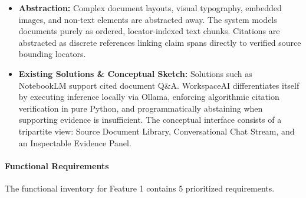 \begin{itemize}[leftmargin=*,itemsep=3pt]
    \item \textbf{Abstraction:} Complex document layouts, visual typography, embedded images, and non-text elements are abstracted away. The system models documents purely as ordered, locator-indexed text chunks. Citations are abstracted as discrete references linking claim spans directly to verified source bounding locators.

    \item \textbf{Existing Solutions \& Conceptual Sketch:} Solutions such as NotebookLM \cite{googleNotebook} support cited document Q\&A. WorkspaceAI differentiates itself by executing inference locally via Ollama, enforcing algorithmic citation verification in pure Python, and programmatically abstaining when supporting evidence is insufficient. The conceptual interface consists of a tripartite view: Source Document Library, Conversational Chat Stream, and an Inspectable Evidence Panel.

\end{itemize}



\paragraph*{Functional Requirements}

The functional inventory for Feature 1 contains 5 prioritized requirements.



\begingroup

\small

\setlength{\tabcolsep}{5pt}

\renewcommand{\arraystretch}{1.15}

